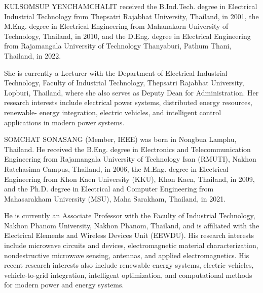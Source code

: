 \begin{IEEEbiography}{KULSOMSUP YENCHAMCHALIT}
received the B.Ind.Tech. degree in Electrical Industrial Technology
from Thepsatri Rajabhat University, Thailand, in 2001, the M.Eng.
degree in Electrical Engineering from Mahanakorn University of
Technology, Thailand, in 2010, and the D.Eng. degree in Electrical
Engineering from Rajamangala University of Technology Thanyaburi,
Pathum Thani, Thailand, in 2022.

She is currently a Lecturer with the Department of Electrical
Industrial Technology, Faculty of Industrial Technology, Thepsatri
Rajabhat University, Lopburi, Thailand, where she also serves as
Deputy Dean for Administration. Her research interests include
electrical power systems, distributed energy resources, renewable-
energy integration, electric vehicles, and intelligent control
applications in modern power systems.
\end{IEEEbiography}


\begin{IEEEbiography}{SOMCHAT SONASANG}
(Member, IEEE) was born in Nongbua Lamphu, Thailand. He received
the B.Eng. degree in Electronics and Telecommunication Engineering
from Rajamangala University of Technology Isan (RMUTI),
Nakhon Ratchasima Campus, Thailand, in 2006, the M.Eng. degree
in Electrical Engineering from Khon Kaen University (KKU),
Khon Kaen, Thailand, in 2009, and the Ph.D. degree in Electrical
and Computer Engineering from Mahasarakham University (MSU),
Maha Sarakham, Thailand, in 2021.

He is currently an Associate Professor with the Faculty of
Industrial Technology, Nakhon Phanom University, Nakhon Phanom,
Thailand, and is affiliated with the Electrical Elements and
Wireless Devices Unit (EEWDU). His research interests include
microwave circuits and devices, electromagnetic material
characterization, nondestructive microwave sensing, antennas,
and applied electromagnetics. His recent research interests also
include renewable-energy systems, electric vehicles, vehicle-to-grid
integration, intelligent optimization, and computational methods
for modern power and energy systems.
\end{IEEEbiography}

